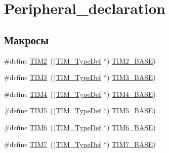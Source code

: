 \hypertarget{group___peripheral__declaration}{}\section{Peripheral\+\_\+declaration}
\label{group___peripheral__declaration}
\subsection*{Макросы}
\begin{DoxyCompactItemize}
\item 
\#define \mbox{\hyperlink{group___peripheral__declaration_ga3cfac9f2e43673f790f8668d48b4b92b}{T\+I\+M2}}~((\mbox{\hyperlink{struct_t_i_m___type_def}{T\+I\+M\+\_\+\+Type\+Def}} $\ast$) \mbox{\hyperlink{group___peripheral__memory__map_ga00d0fe6ad532ab32f0f81cafca8d3aa5}{T\+I\+M2\+\_\+\+B\+A\+SE}})
\item 
\#define \mbox{\hyperlink{group___peripheral__declaration_ga61ee4c391385607d7af432b63905fcc9}{T\+I\+M3}}~((\mbox{\hyperlink{struct_t_i_m___type_def}{T\+I\+M\+\_\+\+Type\+Def}} $\ast$) \mbox{\hyperlink{group___peripheral__memory__map_gaf0c34a518f87e1e505cd2332e989564a}{T\+I\+M3\+\_\+\+B\+A\+SE}})
\item 
\#define \mbox{\hyperlink{group___peripheral__declaration_ga91a09bad8bdc7a1cb3d85cf49c94c8ec}{T\+I\+M4}}~((\mbox{\hyperlink{struct_t_i_m___type_def}{T\+I\+M\+\_\+\+Type\+Def}} $\ast$) \mbox{\hyperlink{group___peripheral__memory__map_ga56e2d44b0002f316527b8913866a370d}{T\+I\+M4\+\_\+\+B\+A\+SE}})
\item 
\#define \mbox{\hyperlink{group___peripheral__declaration_ga5125ff6a23a2ed66e2e19bd196128c14}{T\+I\+M5}}~((\mbox{\hyperlink{struct_t_i_m___type_def}{T\+I\+M\+\_\+\+Type\+Def}} $\ast$) \mbox{\hyperlink{group___peripheral__memory__map_ga3e1671477190d065ba7c944558336d7e}{T\+I\+M5\+\_\+\+B\+A\+SE}})
\item 
\#define \mbox{\hyperlink{group___peripheral__declaration_gac7b4ed55f9201b498b38c962cca97314}{T\+I\+M6}}~((\mbox{\hyperlink{struct_t_i_m___type_def}{T\+I\+M\+\_\+\+Type\+Def}} $\ast$) \mbox{\hyperlink{group___peripheral__memory__map_ga8268ec947929f192559f28c6bf7d1eac}{T\+I\+M6\+\_\+\+B\+A\+SE}})
\item 
\#define \mbox{\hyperlink{group___peripheral__declaration_ga49267c49946fd61db6af8b49bcf16394}{T\+I\+M7}}~((\mbox{\hyperlink{struct_t_i_m___type_def}{T\+I\+M\+\_\+\+Type\+Def}} $\ast$) \mbox{\hyperlink{group___peripheral__memory__map_ga0ebf54364c6a2be6eb19ded6b18b6387}{T\+I\+M7\+\_\+\+B\+A\+SE}})

\end{DoxyCompactItemize}
